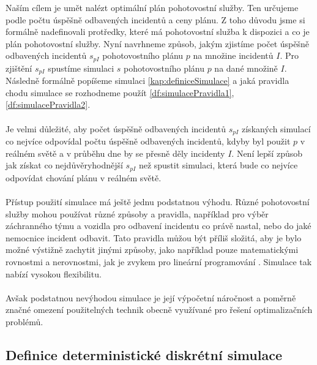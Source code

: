 Naším cílem je umět nalézt optimální plán pohotovostní služby.
Ten určujeme podle počtu úspěšně odbavených incidentů a ceny plánu.
Z toho důvodu jsme si formálně nadefinovali protředky, které má pohotovostní služba k dispozici a co je plán pohotovostní služby.
Nyní navrhneme způsob, jakým zjistíme počet úspěšně odbavených incidentů $s_{pI}$ pohotovostního plánu $p$ na množine incidentů $I$.
Pro zjištění $s_{pI}$ spustíme simulaci $s$ pohotovostního plánu $p$ na dané množině $I$.
Následně formálně popíšeme simulaci \ref{kap:definiceSimulace} a jaká pravidla chodu simulace se rozhodneme použít  \ref{df:simulacePravidla1}, \ref{df:simulacePravidla2}.
\\
\\
Je velmi důležité, aby počet úspěšně odbavených incidentů $s_{pI}$ získaných simulací co nejvíce odpovídal počtu úspěšně odbavených incidentů,
kdyby byl použit $p$ v reálném světě a v průběhu dne by se přesně děly incidenty $I$.
Není lepší způsob jak získat co nejdůvěryhodnější $s_{pI}$ než spustit simulaci, která bude co nejvíce odpovídat chování plánu v reálném světě.
\\
\\
Přístup použití simulace má ještě jednu podstatnou výhodu.
Různé pohotovostní služby mohou používat různé způsoby a pravidla, například pro výběr záchranného týmu a vozidla pro odbavení incidentu co právě nastal, nebo do jaké nemocnice incident odbavit.
Tato pravidla můžou být příliš složitá, aby je bylo možné výstižně zachytit jinými způsoby, jako například pouze matematickými rovnostmi a nerovnostmi, jak je zvykem pro lineární programování \cite{LP}.
Simulace tak nabízí vysokou flexibilitu.
\\
\\
Avšak podstatnou nevýhodou simulace je její výpočetní náročnost a poměrně značné omezení použitelných technik obecně využívané pro řešení optimalizačních problémů.

\subsection{Definice deterministické diskrétní simulace}


